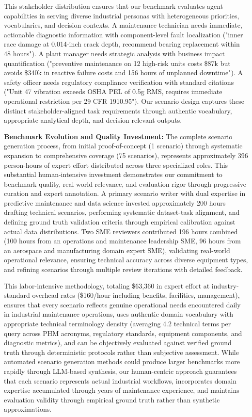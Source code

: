 \documentclass[sigconf, screen, nonacm]{acmart}
\begin{document}
This stakeholder distribution ensures that our benchmark evaluates agent capabilities in serving diverse industrial personas with heterogeneous priorities, vocabularies, and decision contexts. A maintenance technician needs immediate, actionable diagnostic information with component-level fault localization ("inner race damage at 0.014-inch crack depth, recommend bearing replacement within 48 hours"). A plant manager needs strategic analysis with business impact quantification ("preventive maintenance on 12 high-risk units costs \$87k but avoids \$340k in reactive failure costs and 156 hours of unplanned downtime"). A safety officer needs regulatory compliance verification with standard citations ("Unit 47 vibration exceeds OSHA PEL of 0.5g RMS, requires immediate operational restriction per 29 CFR 1910.95"). Our scenario design captures these distinct stakeholder-aligned task requirements through authentic vocabulary, appropriate analytical depth, and decision-relevant outputs.

\textbf{Benchmark Evolution and Quality Investment:} The complete scenario generation process, from initial proof-of-concept (1 scenario) through systematic expansion to comprehensive coverage (75 scenarios), represents approximately 396 person-hours of expert effort distributed across three specialized roles. This substantial human-intensive investment demonstrates our commitment to benchmark quality, real-world relevance, and evaluation rigor through progressive curation and expert annotation. A primary scenario writer with dual expertise in predictive maintenance and data science invested approximately 200 hours drafting technical scenarios, performing systematic dataset-task alignment, and defining ground truth validation criteria through empirical calibration against actual data distributions. Two SME reviewers contributed 196 hours combined (100 hours from an operations and maintenance leadership SME, 96 hours from an aerospace and manufacturing domain expert SME), validating real-world operational relevance, ensuring technical accuracy across diverse equipment types, and refining scenarios through multiple review iterations with detailed feedback.

This labor-intensive methodology, totaling \$63,360 in expert effort at industry-standard overhead rates (\$160/hour including benefits, facilities, management), ensures that every scenario reflects genuine operational needs encountered daily in industrial maintenance operations, uses authentic domain vocabulary with appropriate technical terminology density (averaging 4.2 technical terms per query across PHM acronyms, regulatory standards, equipment components, and diagnostic metrics), and can be objectively evaluated against verified ground truth through deterministic protocols rather than subjective assessment. While automated scenario generation methods could produce larger benchmarks more rapidly through LLM-based synthesis, our human-centric approach guarantees that each scenario represents actual industrial workflows, incorporates domain expertise accumulated through years of maintenance experience, and maintains evaluation validity through empirical ground truth rather than synthetic approximations.
\end{document}
